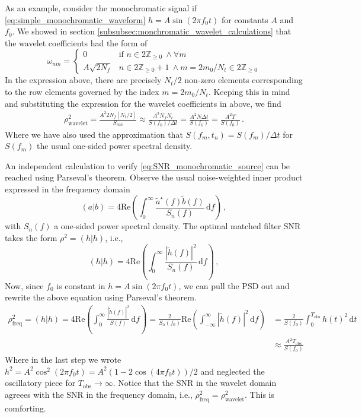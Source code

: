 \documentclass{article}
\begin{document}
As an example, consider the monochromatic signal if \eqref{eq:simple_monochromatic_waveform} $h = A\sin(2\pi f_{0} t)$ for constants $A$ and $f_{0}$. We showed in section \ref{subsubsec:monchromatic_wavelet_calculations} that the wavelet coefficients had the form of  
\begin{equation}
\omega_{nm} = 
\begin{cases}
     0 & \text{if } n \in 2\mathbb{Z}_{\geq 0} \ \wedge \forall m\\
    A\sqrt{2 N_{f}} & n \in 2\mathbb{Z}_{\geq 0} + 1 \ \wedge  m = 2m_{0}/N_{t} \in 2\mathbb{Z}_{\geq 0}
\end{cases}
\end{equation}
In the expression above, there are precisely $N_{t}/2$ non-zero elements corresponding to the row elements governed by the index $m = 2m_{0}/N_{t}$. Keeping this in mind and substituting the expression for the wavelet coefficients in above, we find
\begin{align}\label{eq:SNR_monochromatic_source}
\rho^{2}_\text{wavelet} = \frac{A^{2} 2 N_{f} [N_{t}/2]}{S_{nm}} \approx \frac{A^{2} N_{f} N_{t}}{S(f_{0})/\Delta t} 
 = \frac{A^{2} N\Delta t}{S(f_{0})} 
 = \frac{A^2 T}{S(f_{0})}\,.
\end{align}
Where we have also used the approximation that $S(f_{m},t_{n}) = S(f_{m})/\Delta t$ for $S(f_{m})$ the usual one-sided power spectral density.

An independent calculation to verify \eqref{eq:SNR_monochromatic_source} can be reached using Parseval's theorem. Observe the usual noise-weighted inner product expressed in the frequency domain
\begin{equation}
(a|b) = 4\text{Re}\left(\int_{0}^{\infty}\frac{\tilde{a}^{\star}(f)\tilde{b}(f)}{S_{n}(f)}\,\text{d}f\right)\,,
\end{equation}
with $S_{n}(f)$ a one-sided power spectral density. The optimal matched filter SNR takes the form $\rho^2 = (h|h)$, i.e.,
\begin{equation}
(h|h) = 4\text{Re}\left(\int_{0}^{\infty}\frac{|\tilde{h}(f)|^2}{S_{n}(f)}\,\text{d}f\right)\,,
\end{equation}
Now, since $f_{0}$ is constant in $h = A\sin(2\pi f_{0}t)$, we can pull the PSD out and rewrite the above equation using Parseval's theorem.
\begin{align}
\rho_{\text{freq}}^2 = (h|h) = 4\text{Re}\left(\int_{0}^{\infty}\frac{|\tilde{h}(f)|^2}{S(f)}\,\text{d}f\right) = \frac{2}{S_{n}(f_{0})}\text{Re}\left(\int_{-\infty}^{\infty}|\tilde{h}(f)|^2\,\text{d}f\right) &= \frac{2}{S(f_{0})}\int_{0}^{T_{\text{obs}}}h(t)^2\,\text{d}t \\ 
&\approx \frac{A^2 T_{\text{obs}}}{S(f_{0})} \label{eq:SNR_monochromatic_signal_freq}
\end{align}
Where in the last step we wrote $h^2 = A^2\cos^2(2\pi f_{0} t) = A^2(1 - 2\cos(4\pi f_{0}t))/2$ and neglected the oscillatory piece for $T_{\text{obs}}\rightarrow \infty$. Notice that the SNR in the wavelet domain agreees with the SNR in the frequency domain, i.e., $\rho^2_{\text{freq}} = \rho^2 _{\text{wavelet}}$. This is comforting. 
\end{document}
